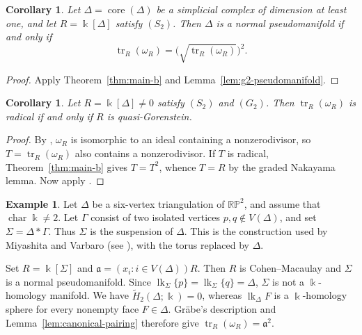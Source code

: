 \documentclass[a4paper,11pt]{amsart}
\theoremstyle{plain}
\newtheorem{corollary}[theorem]{Corollary}
\theoremstyle{definition}
\newtheorem{example}[theorem]{Example}
\theoremstyle{remark}
\DeclareMathOperator{\tr}{tr}
\DeclareMathOperator{\core}{core}
\newcommand{\kk}{\Bbbk}
\begin{document}
\begin{corollary}\label{cor:core-square}
Let $\Delta=\core(\Delta)$ be a simplicial complex of dimension at least one, and let $R=\kk[\Delta]$ satisfy $(S_2)$. Then $\Delta$ is a normal pseudomanifold if and only if
\[
\tr_R(\omega_R)=\bigl(\sqrt{\tr_R(\omega_R)}\bigr)^2.
\]
\end{corollary}
\begin{proof}
Apply Theorem~\ref{thm:main-b} and Lemma~\ref{lem:g2-pseudomanifold}.
\end{proof}

\begin{corollary}\label{cor:radical-qg}
Let $R=\kk[\Delta]\ne0$ satisfy $(S_2)$ and $(G_2)$. Then $\tr_R(\omega_R)$ is radical if and only if $R$ is quasi-Gorenstein.
\end{corollary}
\begin{proof}
By \cite[Remark~2.13]{KM26}, $\omega_R$ is isomorphic to an ideal containing a nonzerodivisor, so $T=\tr_R(\omega_R)$ also contains a nonzerodivisor. If $T$ is radical, Theorem~\ref{thm:main-b} gives $T=T^2$, whence $T=R$ by the graded Nakayama lemma. Now apply \cite[Remark~2.9\,(4)]{KM26}.
\end{proof}

\begin{example}\label{ex:square-nonisolated}
Let $\Delta$ be a six-vertex triangulation of $\mathbb{RP}^2$, and assume that $\operatorname{char}\kk\ne2$. Let $\Gamma$ consist of two isolated vertices $p,q\notin V(\Delta)$, and set $\Sigma=\Delta*\Gamma$. Thus $\Sigma$ is the suspension of $\Delta$. This is the construction used by Miyashita and Varbaro (see \cite[Remark~2.7]{MV}), with the torus replaced by $\Delta$.

Set $R=\kk[\Sigma]$ and $\mathfrak a=(x_i:i\in V(\Delta))R$. Then $R$ is Cohen--Macaulay and $\Sigma$ is a normal pseudomanifold. Since $\operatorname{lk}_\Sigma\{p\}=\operatorname{lk}_\Sigma\{q\}=\Delta$, $\Sigma$ is not a $\kk$-homology manifold. We have $\widetilde H_2(\Delta;\kk)=0$, whereas $\operatorname{lk}_\Delta F$ is a $\kk$-homology sphere for every nonempty face $F\in\Delta$. Gr\"abe's description and Lemma~\ref{lem:canonical-pairing} therefore give $\tr_R(\omega_R)=\mathfrak a^2$.
\end{example}
\end{document}
